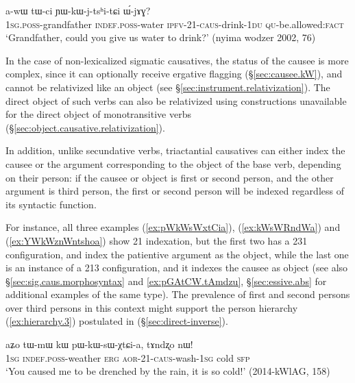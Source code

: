 \begin{exe}
	\ex \label{ex:YWkWjtshitCi}
	\gll a-wɯ tɯ-ci ɲɯ-kɯ-j-tsʰi-tɕi ɯ́-jɤɣ? \\
	\textsc{1sg}.\textsc{poss}-grandfather \textsc{indef}.\textsc{poss}-water \textsc{ipfv}-2\fl{}1-\textsc{caus}-drink-\textsc{1du} \textsc{qu}-be.allowed:\textsc{fact} \\
	\glt `Grandfather, could you give us water to drink?' (nyima wodzer 2002, 76)
\end{exe}

In the case of non-lexicalized sigmatic causatives, the status of the causee is more complex, since it can optionally receive ergative flagging (§\ref{sec:causee.kW}), and cannot be relativized like an object (see §\ref{sec:instrument.relativization}). The direct object of such verbs can also be relativized using constructions unavailable for the direct object of monotransitive verbs (§\ref{sec:object.causative.relativization}).

In addition, unlike secundative verbs, triactantial causatives can either index the causee or the argument corresponding to the object of the base verb, depending on their person: if the causee or object is first or second person, and the other argument is third person, the first or second person will be indexed regardless of its syntactic function. 

For instance, all three examples (\ref{ex:pWkWsWxtCia}), (\ref{ex:kWsWRndWa}) and (\ref{ex:YWkWznWntshoa}) show 2\fl{}1 indexation, but the first two has a 2\fl{}3\fl{}1 configuration, and index the patientive argument as the object, while the last one is an instance of a 2\fl{}1\fl{}3 configuration, and it indexes the causee as object (see also §\ref{sec:sig.caus.morphosyntax} and \ref{ex:pGAtCW.tAmdzu}, §\ref{sec:essive.abs} for additional examples of the same type). The prevalence of first and second persons over third persons in this context might support the person hierarchy (\ref{ex:hierarchy.3}) postulated in (§\ref{sec:direct-inverse}).

\begin{exe}
	\ex \label{ex:pWkWsWxtCia}
	\gll  aʑo tɯ-mɯ kɯ pɯ-kɯ-sɯ-χtɕi-a, tɤndʐo nɯ! \\
	\textsc{1sg} \textsc{indef}.\textsc{poss}-weather \textsc{erg} \textsc{aor}-2\fl{}1-\textsc{caus}-wash-\textsc{1sg} cold \textsc{sfp} \\
	\glt `You caused me to be drenched by the rain, it is so cold!' (2014-kWlAG, 158)
\end{exe}

